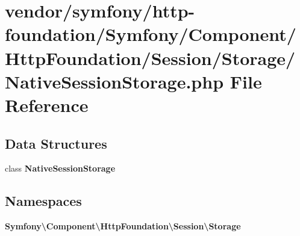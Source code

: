 \section{vendor/symfony/http-\/foundation/\+Symfony/\+Component/\+Http\+Foundation/\+Session/\+Storage/\+Native\+Session\+Storage.php File Reference}
\label{_native_session_storage_8php}
\subsection*{Data Structures}
\begin{DoxyCompactItemize}
\item 
class {\bf Native\+Session\+Storage}
\end{DoxyCompactItemize}
\subsection*{Namespaces}
\begin{DoxyCompactItemize}
\item 
 {\bf Symfony\textbackslash{}\+Component\textbackslash{}\+Http\+Foundation\textbackslash{}\+Session\textbackslash{}\+Storage}
\end{DoxyCompactItemize}
